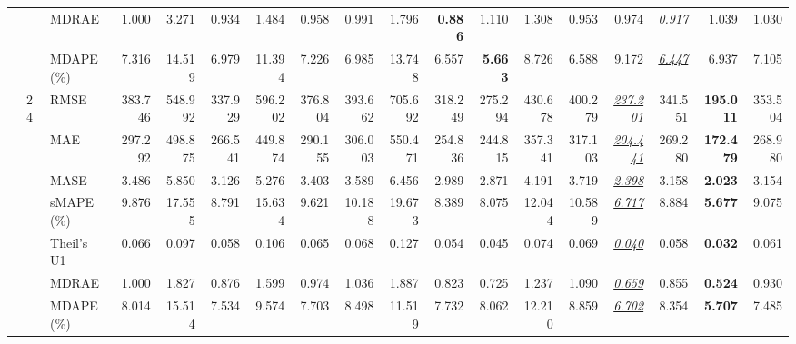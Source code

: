 \begin{table}[!htbp]
{\begin{tabular}{lllrrrrrrrrrrrrrrr}
 &  & MDRAE & 1.000 & 3.271 & 0.934 & 1.484 & 0.958 & 0.991 & 1.796 & \textbf{0.886} & 1.110 & 1.308 & 0.953 & 0.974 & \underline{\textit{0.917}} & 1.039 & 1.030 \\
 &  & MDAPE (\%) & 7.316 & 14.519 & 6.979 & 11.394 & 7.226 & 6.985 & 13.748 & 6.557 & \textbf{5.663} & 8.726 & 6.588 & 9.172 & \underline{\textit{6.447}} & 6.937 & 7.105 \\
\cmidrule(lr){2-18}
 & 24 & RMSE & 383.746 & 548.992 & 337.929 & 596.202 & 376.804 & 393.662 & 705.692 & 318.249 & 275.294 & 430.678 & 400.279 & \underline{\textit{237.201}} & 341.551 & \textbf{195.011} & 353.504 \\
 &  & MAE & 297.292 & 498.875 & 266.541 & 449.874 & 290.155 & 306.003 & 550.471 & 254.836 & 244.815 & 357.341 & 317.103 & \underline{\textit{204.441}} & 269.280 & \textbf{172.479} & 268.980 \\
 &  & MASE & 3.486 & 5.850 & 3.126 & 5.276 & 3.403 & 3.589 & 6.456 & 2.989 & 2.871 & 4.191 & 3.719 & \underline{\textit{2.398}} & 3.158 & \textbf{2.023} & 3.154 \\
 &  & sMAPE (\%) & 9.876 & 17.555 & 8.791 & 15.634 & 9.621 & 10.188 & 19.673 & 8.389 & 8.075 & 12.044 & 10.589 & \underline{\textit{6.717}} & 8.884 & \textbf{5.677} & 9.075 \\
 &  & Theil's U1 & 0.066 & 0.097 & 0.058 & 0.106 & 0.065 & 0.068 & 0.127 & 0.054 & 0.045 & 0.074 & 0.069 & \underline{\textit{0.040}} & 0.058 & \textbf{0.032} & 0.061 \\
 &  & MDRAE & 1.000 & 1.827 & 0.876 & 1.599 & 0.974 & 1.036 & 1.887 & 0.823 & 0.725 & 1.237 & 1.090 & \underline{\textit{0.659}} & 0.855 & \textbf{0.524} & 0.930 \\
 &  & MDAPE (\%) & 8.014 & 15.514 & 7.534 & 9.574 & 7.703 & 8.498 & 11.519 & 7.732 & 8.062 & 12.210 & 8.859 & \underline{\textit{6.702}} & 8.354 & \textbf{5.707} & 7.485 \\
\bottomrule
\end{tabular}}
\end{table}
